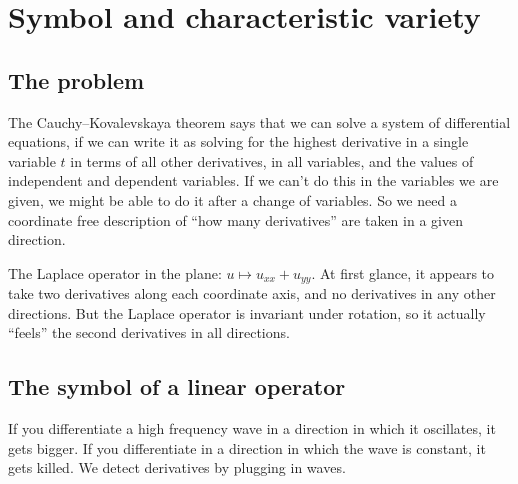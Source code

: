 \chapter{Symbol and characteristic variety}\label{chapter:characteristics}%
\section{The problem}
The Cauchy--Kovalevskaya theorem says that we can solve a system of differential equations, if we can write it as solving for the highest derivative in a single variable \(t\) in terms of all other derivatives, in all variables, and the values of independent and dependent variables.
If we can't do this in the variables we are given, we might be able to do it after a change of variables. 
So we need a coordinate free description of ``how many derivatives'' are taken in a given direction.
\begin{example}The Laplace operator in the plane: \(u \mapsto u_{xx}+u_{yy}\).
At first glance, it appears to take two derivatives along each coordinate axis, and no derivatives in any other directions.
But the Laplace operator is invariant under rotation, so it actually ``feels'' the second derivatives in all directions.
\end{example}

\section{The symbol of a linear operator}
If you differentiate a high frequency wave in a direction in which it oscillates, it gets bigger.
If you differentiate in a direction in which the wave is constant, it gets killed.
We detect derivatives by plugging in waves.

